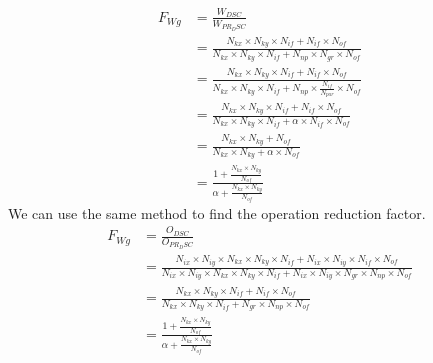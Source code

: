 \begin{align*}
    F_{Wg} &= \frac{W_{DSC}}{W_{PR_DSC}} \\
           &= \frac{N_{kx} \times N_{ky} \times N_{if} + N_{if} \times N_{of}}{N_{kx} \times N_{ky} \times N_{if} + N_{np} \times N_{gr} \times N_{of}}\\
           &= \frac{N_{kx} \times N_{ky} \times N_{if} + N_{if} \times N_{of}}{N_{kx} \times N_{ky} \times N_{if} + N_{np} \times \frac{N_{if}}{N_{par}} \times N_{of}}\\
           &= \frac{N_{kx} \times N_{ky} \times N_{if} + N_{if} \times N_{of}}{N_{kx} \times N_{ky} \times N_{if} + \alpha \times N_{if} \times N_{of}}\\
           &= \frac{N_{kx} \times N_{ky} + N_{of}}{N_{kx} \times N_{ky} + \alpha \times N_{of}}\\
           &= \frac{1 + \frac{N_{kx} \times N_{ky}} {N_{of}}} {\alpha + \frac{N_{kx} \times N_{ky}} {N_{of}}}
\end{align*}
%
We can use the same method to find the operation reduction factor.
%
\begin{align*}
    F_{Wg} &= \frac{O_{DSC}}{O_{PR_DSC}} \\
           &= \frac{N_{ix} \times N_{iy} \times N_{kx} \times N_{ky} \times N_{if} + N_{ix} \times N_{iy} \times N_{if} \times N_{of}}{N_{ix} \times N_{iy} \times N_{kx} \times N_{ky} \times N_{if} + N_{ix} \times N_{iy} \times N_{gr} \times N_{np} \times N_{of}}\\
           &= \frac{N_{kx} \times N_{ky} \times N_{if} + N_{if} \times N_{of}}{N_{kx} \times N_{ky} \times N_{if} + N_{gr} \times N_{np} \times N_{of}}\\
           &= \frac{1 + \frac{N_{kx} \times N_{ky}} {N_{of}}} {\alpha + \frac{N_{kx} \times N_{ky}} {N_{of}}}
\end{align*}
%
\newpage